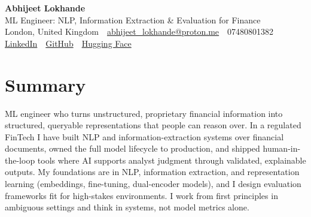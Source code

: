 \documentclass[10pt,a4paper]{article}
\newcommand{\sep}{\,\textcolor{accent!60}{\textbar}\,}
\begin{document}
\begin{center}
  {\fontsize{24}{26}\selectfont\bfseries Abhijeet Lokhande}\\[2pt]
  {\color{accent}\large ML Engineer: NLP, Information Extraction \& Evaluation for Finance}\\[4pt]
  {\small
    London, United Kingdom \sep
    \href{mailto:abhijeet_lokhande@proton.me}{abhijeet\_lokhande@proton.me} \sep
    07480801382 \\[2pt]
    \href{https://www.linkedin.com/in/ablds/}{LinkedIn} \sep
    \href{https://github.com/abhijeetscode}{GitHub} \sep
    \href{https://huggingface.co/ab-ai}{Hugging Face}
  }
\end{center}

\section{Summary}
ML engineer who turns unstructured, proprietary financial information into structured, queryable representations that people can reason over. In a regulated FinTech I have built NLP and information-extraction systems over financial documents, owned the full model lifecycle to production, and shipped human-in-the-loop tools where AI supports analyst judgment through validated, explainable outputs. My foundations are in NLP, information extraction, and representation learning (embeddings, fine-tuning, dual-encoder models), and I design evaluation frameworks fit for high-stakes environments. I work from first principles in ambiguous settings and think in systems, not model metrics alone.

\end{document}
